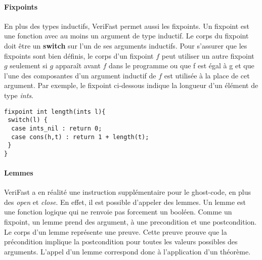 \documentclass[11pt,openany]{article}
\newcommand{\verifast}{VeriFast}
\begin{document}
			\paragraph{Fixpoints}
				En plus des types inductifs, \verifast{} permet aussi les fixpoints. Un fixpoint est une fonction avec au moins un argument de type inductif. Le corps du fixpoint doit \^etre un \textbf{switch} sur l'un de ses arguments inductifs. Pour s'assurer que les fixpoints sont bien d\'efinis, le corps d'un fixpoint $f$ peut utiliser un autre fixpoint $g$ seulement si $g$ appara\^it avant $f$ dans le programme ou que f est \'egal \`a g et que l'une des composantes d'un argument inductif de $f$ est utilis\'ee \`a la place de cet argument. Par exemple, le fixpoint ci-dessous indique la longueur d'un \'el\'ement de type \textit{ints}.
			\begin{lstlisting}
fixpoint int length(ints l){
 switch(l) {
  case ints_nil : return 0;
  case cons(h,t) : return 1 + length(t);
 }
}
			\end{lstlisting}
			\paragraph{Lemmes}
			\verifast{} a en r\'ealit\'e une instruction suppl\'ementaire pour le ghost-code, en plus des \textit{open} et \textit{close}. En effet, il est possible d'appeler des lemmes. Un lemme est une fonction logique qui ne renvoie pas forcement un bool\'een. Comme un fixpoint, un lemme prend des argument, \`a une precondition et une postcondition. Le corps d'un lemme repr\'esente une preuve. Cette preuve prouve que la pr\'econdition implique la postcondition pour toutes les valeurs possibles des arguments. L'appel d'un lemme correspond donc \`a l'application d'un th\'eor\`eme.
			
\end{document}
